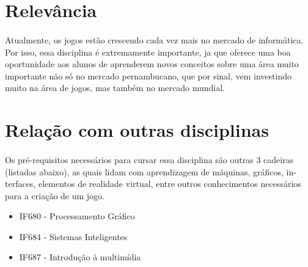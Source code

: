 \documentclass[10pt]{article}
\begin{document}
\section{Relevância}
\paragraph{} Atualmente, os jogos estão crescendo cada vez mais no mercado de informática. Por isso, essa disciplina é extremamente importante, ja que oferece uma boa oportunidade aos alunos de aprenderem novos conceitos sobre uma área muito importante não só no mercado pernambucano, que por sinal, vem investindo muito na área de jogos, mas também no mercado mundial. 

\section{Relação com outras disciplinas}
\paragraph{} Os pré-requisitos necessários para cursar essa disciplina são outras 3 cadeiras (listadas abaixo), as quais lidam com aprendizagem de máquinas, gráficos, in-terfaces, elementos de realidade virtual, entre outros conhecimentos necessários para a criação de um jogo.
\begin{itemize}
    \item IF680 - Processamento Gráfico
    \item IF684 - Sistemas Inteligentes
    \item IF687 - Introdução à multimídia
 \end{itemize}
\paragraph{} 



\end{document}
